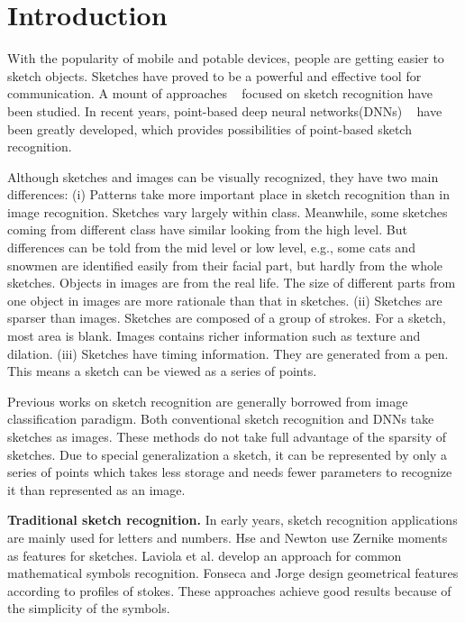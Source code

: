 \section{Introduction}
\label{sec:intro}

With the popularity of mobile and potable devices, people are getting easier to sketch objects. Sketches have proved to be a powerful and effective tool for communication. A mount of approaches ~\cite{Eitz2012HowDH, LiHSG15, Schneider2014SketchCA, Yu2015SketchaNetTB, Seddati2015DeepSketchDC, Dupont2016DeepSketch2D} focused on sketch recognition have been studied. In recent years, point-based deep neural networks(DNNs) ~\cite{qi2017pointnet, qi2017pointnetplusplus, 1801.07791} have been greatly developed, which provides possibilities of point-based sketch recognition.

Although sketches and images can be visually recognized, they have two main differences: (i) Patterns take more important place in sketch recognition than in image recognition. Sketches vary largely within class. Meanwhile, some sketches coming from different class have similar looking from the high level. But differences can be told from the mid level or low level, e.g., some cats and snowmen are identified easily from their facial part, but hardly from the whole sketches. Objects in images are from the real life. The size of different parts from one object in images are more rationale than that in sketches. (ii) Sketches are sparser than images. Sketches are composed of a group of strokes. For a sketch, most area is blank. Images contains richer information such as texture and dilation. (iii) Sketches have timing information. They are generated from a pen. This means a sketch can be viewed as a series of points.

Previous works on sketch recognition are generally borrowed from image classification paradigm. Both conventional sketch recognition and DNNs take sketches as images. These methods do not take full advantage of the sparsity of sketches. Due to special generalization a sketch, it can be represented by only a series of points which takes less storage and needs fewer parameters to recognize it than represented as an image.

\textbf{Traditional sketch recognition.} In early years, sketch recognition applications \cite{Hse2004SketchedSR, LaViola2004MathPad2AS, Fonseca2000UsingFL} are mainly used for letters and numbers. Hse and Newton \cite{Hse2004SketchedSR} use Zernike moments as features for sketches. Laviola et al. \cite{LaViola2004MathPad2AS} develop an approach for common mathematical symbols recognition. Fonseca and Jorge \cite{Fonseca2000UsingFL} design geometrical features  according to profiles of stokes. These approaches achieve good results because of the simplicity of the symbols.


